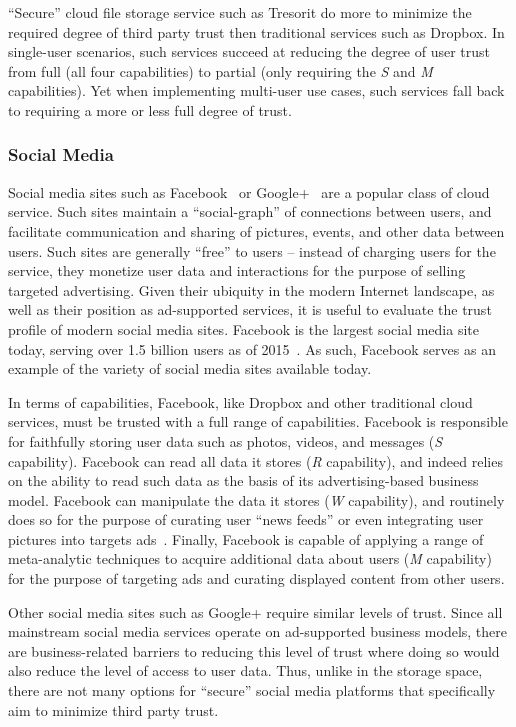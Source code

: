 ``Secure'' cloud file storage service such as Tresorit do more to
minimize the required degree of third party trust then traditional
services such as Dropbox. In single-user scenarios, such services
succeed at reducing the degree of user trust from full (all four
capabilities) to partial (only requiring the \emph{S} and \emph{M}
capabilities). Yet when implementing multi-user use cases, such
services fall back to requiring a more or less full degree of trust.

\subsubsection{Social Media}

Social media sites such as Facebook~\cite{facebook} or
Google+~\cite{google-plus} are a popular class of cloud service. Such
sites maintain a ``social-graph'' of connections between users, and
facilitate communication and sharing of pictures, events, and other
data between users. Such sites are generally ``free'' to users --
instead of charging users for the service, they monetize user data and
interactions for the purpose of selling targeted advertising. Given
their ubiquity in the modern Internet landscape, as well as their
position as ad-supported services, it is useful to evaluate the trust
profile of modern social media sites. Facebook is the largest social
media site today, serving over 1.5 billion users as of
2015~\cite{foster2014}. As such, Facebook serves as an example of the
variety of social media sites available today.

In terms of capabilities, Facebook, like Dropbox and other traditional
cloud services, must be trusted with a full range of capabilities.
Facebook is responsible for faithfully storing user data such as
photos, videos, and messages (\emph{S} capability). Facebook can read
all data it stores (\emph{R} capability), and indeed relies on the
ability to read such data as the basis of its advertising-based
business model. Facebook can manipulate the data it stores (\emph{W}
capability), and routinely does so for the purpose of curating user
``news feeds'' or even integrating user pictures into targets
ads~\cite{mashable-socialads}. Finally, Facebook is capable of
applying a range of meta-analytic techniques to acquire additional
data about users (\emph{M} capability) for the purpose of targeting
ads and curating displayed content from other users.

Other social media sites such as Google+ require similar levels of
trust. Since all mainstream social media services operate on
ad-supported business models, there are business-related barriers to
reducing this level of trust where doing so would also reduce the
level of access to user data. Thus, unlike in the storage space, there
are not many options for ``secure'' social media platforms that
specifically aim to minimize third party trust.

